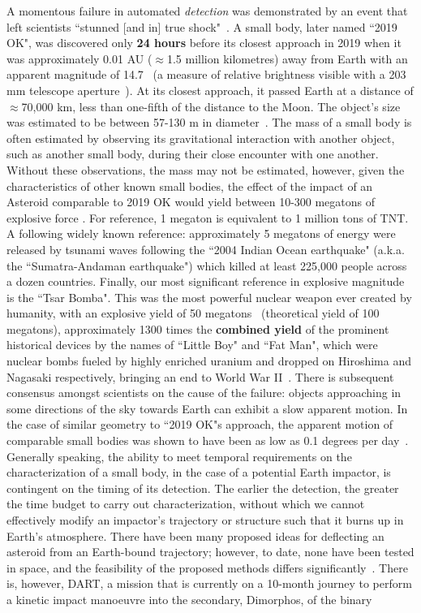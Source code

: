A momentous failure in automated \textit{detection} was demonstrated by an event that left scientists {``stunned [and in] true shock"}~\cite{chiu_2019}. A small body, later named ``2019 OK",  was discovered only \textbf{24 hours} before its closest approach in 2019 when it was approximately 0.01 AU ($\approx$1.5 million kilometres) away from Earth with an apparent magnitude of 14.7~\cite{IAU2019OK} (a measure of relative brightness visible with a 203 mm telescope aperture~\cite[p.~24]{North2014}). At its closest approach, it passed  Earth at a distance of $\approx$70,000 km, less than one-fifth of the distance to the Moon. The object's size was estimated to be between 57-130 m in diameter~\cite{NASA2019}. The mass of a small body is often estimated by observing its gravitational interaction with another object, such as another small body, during their close encounter with one another. Without these observations, the mass may not be estimated, however, given the characteristics of other known small bodies, the effect of the impact of an Asteroid comparable to 2019 OK would yield between 10-300 megatons of explosive force \cite{Cellino1999, Rumpf2017}. For reference, 1 megaton is equivalent to 1 million tons of TNT. A following widely known reference: approximately 5 megatons of energy were released by tsunami waves following the ``2004 Indian Ocean earthquake" (a.k.a. the ``Sumatra-Andaman earthquake") \cite{Nirupama2006} which killed at least 225,000 people across a dozen countries. Finally, our most significant reference in explosive magnitude is the ``Tsar Bomba". This was the most powerful nuclear weapon ever created by humanity, with an explosive yield of 50 megatons~\cite{Khan2020} (theoretical yield of 100 megatons), approximately 1300 times the \textbf{combined yield} of the prominent historical devices by the names of ``Little Boy" and ``Fat Man", which were nuclear bombs fueled by highly enriched uranium and dropped on Hiroshima and Nagasaki respectively, bringing an end to World War II~\cite{malik1985}. There is subsequent consensus amongst scientists on the cause of the failure: objects approaching in some directions of the sky towards Earth can exhibit a slow apparent motion. In the case of similar geometry to ``2019 OK"s approach, the apparent motion of comparable small bodies was shown to have been as low as 0.1 degrees per day~\cite{Wainscoat2022}. Generally speaking, the ability to meet temporal requirements on the characterization of a small body, in the case of a potential Earth impactor, is contingent on the timing of its detection. The earlier the detection, the greater the time budget to carry out characterization, without which we cannot effectively modify an impactor's trajectory or structure such that it burns up in Earth's atmosphere. There have been many proposed ideas for deflecting an asteroid from an Earth-bound trajectory; however, to date, none have been tested in space, and the feasibility of the proposed methods differs significantly~\cite{Harris2015}. There is, however,  \gls{DART}, a mission that is currently on a 10-month journey to perform a kinetic impact manoeuvre into the secondary, Dimorphos, of the binary 